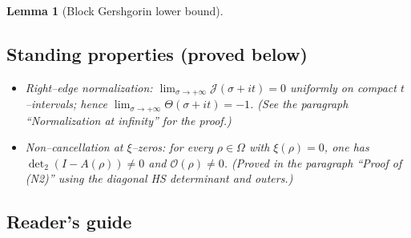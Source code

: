 \documentclass[11pt]{article}
\newtheorem{lemma}{Lemma}[section]
\theoremstyle{definition}
\theoremstyle{remark}
\begin{document}
\begin{lemma}[Block Gershgorin lower bound]
\vspace{1.0cm}
\subsection*{Standing properties (proved below)}\label{sec:standing-assumptions}
\begin{itemize}
\item[(N1)] Right--edge normalization: $\displaystyle \lim_{\sigma\to+\infty}\mathcal J(\sigma+it)=0$ uniformly on compact $t$--intervals; hence $\lim_{\sigma\to+\infty}\Theta(\sigma+it)=-1$. (See the paragraph ``Normalization at infinity'' for the proof.)
\item[(N2)] Non--cancellation at $\xi$--zeros: for every $\rho\in\Omega$ with $\xi(\rho)=0$, one has $\det_2(I-A(\rho))\ne 0$ and $\mathcal O(\rho)\ne 0$. (Proved in the paragraph ``Proof of (N2)'' using the diagonal HS determinant and outers.)
\end{itemize}







\vspace{1.0cm}
\subsection*{Reader's guide}


\end{lemma}
\end{document}

